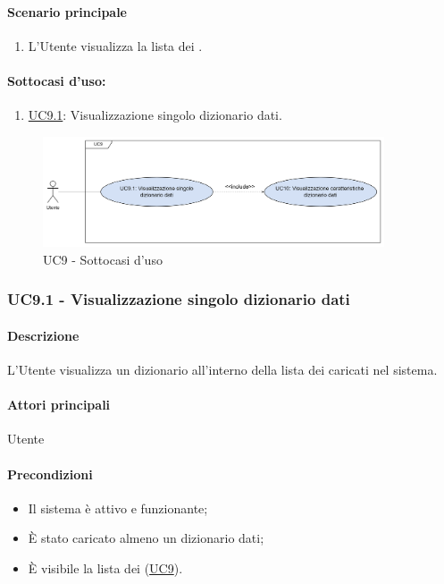 \paragraph*{Scenario principale}
\begin{enumerate}
  \item L'Utente visualizza la lista dei .
\end{enumerate}

\paragraph*{Sottocasi d'uso:}
\begin{enumerate}
  \item \hyperref[UC9point1]{UC9.1}: Visualizzazione singolo dizionario dati.
\end{enumerate}

\begin{figure}[H]
  \centering
  \includegraphics[width=0.90\textwidth]{assets/uc9_1.png}
  \caption{UC9 - Sottocasi d'uso}
\end{figure}


\subsubsection{UC9.1 - Visualizzazione singolo dizionario dati}\label{UC9point1}
\paragraph*{Descrizione}
L'Utente visualizza un dizionario all'interno della lista dei  caricati nel sistema.

\paragraph*{Attori principali}
Utente

\paragraph*{Precondizioni}
\begin{itemize}
  \item Il sistema è attivo e funzionante;
  \item È stato caricato almeno un dizionario dati;
  \item È visibile la lista dei  (\hyperref[UC9]{UC9}).
\end{itemize}

